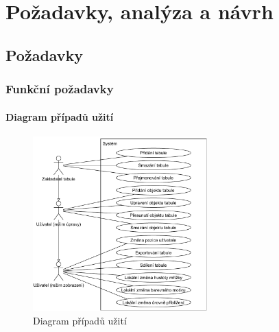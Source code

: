 \chapter{Požadavky, analýza a návrh}
\label{chap:3}
\section{Požadavky}
\label{sec:3.1}
\subsection{Funkční požadavky}
\subsubsection{Diagram případů užití}
\begin{figure}[h!]
	\centering
	\includegraphics[width=0.6\textwidth]{Figures/UseCaseDiagram.pdf}
	\caption{Diagram případů užití}
	\label{fig:UseCaseDiagram}
\end{figure}
\clearpage




